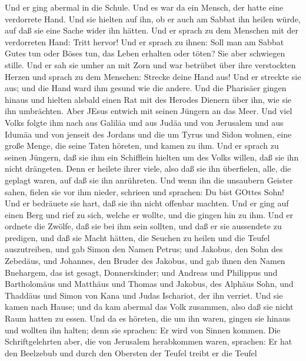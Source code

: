  Und er ging abermal in die Schule. Und es war da ein
Mensch, der hatte eine verdorrete Hand.  Und sie hielten auf
ihn, ob er auch am Sabbat ihn heilen würde, auf daß sie eine Sache wider
ihn hätten.  Und er sprach zu dem Menschen mit der
verdorreten Hand: Tritt hervor!  Und er sprach zu ihnen:
Soll man am Sabbat Gutes tun oder Böses tun, das Leben erhalten oder
töten? Sie aber schwiegen stille.  Und er sah sie umher an
mit Zorn und war betrübet über ihre verstockten Herzen und sprach zu dem
Menschen: Strecke deine Hand aus! Und er streckte sie aus; und die Hand
ward ihm gesund wie die andere.  Und die Pharisäer gingen
hinaus und hielten alsbald einen Rat mit des Herodes Dienern über ihn,
wie sie ihn umbrächten.  Aber JEsus entwich mit seinen
Jüngern an das Meer. Und viel Volks folgte ihm nach aus Galiläa und aus
Judäa  und von Jerusalem und aus Idumäa und von jenseit des
Jordans und die um Tyrus und Sidon wohnen, eine große Menge, die seine
Taten höreten, und kamen zu ihm.  Und er sprach zu seinen
Jüngern, daß sie ihm ein Schifflein hielten um des Volks willen, daß sie
ihn nicht drängeten.  Denn er heilete ihrer viele, also daß
sie ihn überfielen, alle, die geplagt waren, auf daß sie ihn anrühreten.
 Und wenn ihn die unsaubern Geister sahen, fielen sie vor
ihm nieder, schrieen und sprachen: Du bist GOttes Sohn! 
Und er bedräuete sie hart, daß sie ihn nicht offenbar machten.
 Und er ging auf einen Berg und rief zu sich, welche er
wollte, und die gingen hin zu ihm.  Und er ordnete die
Zwölfe, daß sie bei ihm sein sollten, und daß er sie aussendete zu
predigen,  und daß sie Macht hätten, die Seuchen zu heilen
und die Teufel auszutreiben,  und gab Simon den Namen
Petrus;  und Jakobus, den Sohn des Zebedäus, und Johannes,
den Bruder des Jakobus, und gab ihnen den Namen Bnehargem, das ist
gesagt, Donnerskinder;  und Andreas und Philippus und
Bartholomäus und Matthäus und Thomas und Jakobus, des Alphäus Sohn, und
Thaddäus und Simon von Kana  und Judas Ischariot, der ihn
verriet.  Und sie kamen nach Hause; und da kam abermal das
Volk zusammen, also daß sie nicht Raum hatten zu essen. 
Und da es höreten, die um ihn waren, gingen sie hinaus und wollten ihn
halten; denn sie sprachen: Er wird von Sinnen kommen.  Die
Schriftgelehrten aber, die von Jerusalem herabkommen waren, sprachen: Er
hat den Beelzebub und durch den Obersten der Teufel treibt er die Teufel
